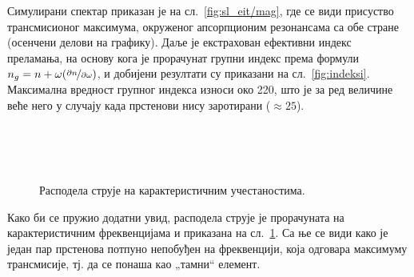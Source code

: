 \documentclass[main.tex]{subfiles}
\begin{document}
Симулирани спектар приказан је на сл.~\ref{fig:sl_eit/mag}, где се види присуство трансмисионог максимума, окруженог апсорпционим резонансама са обе стране (осенчени делови на графику). Даље је екстрахован ефективни индекс преламања, на основу кога је прорачунат групни индекс према формули $n_g = n + \omega(\nicefrac{\partial n}{\partial \omega})$, и добијени резултати су приказани на сл.~\ref{fig:indeksi}. Максимална вредност групног индекса износи око 220, што је за ред величине веће него у случају када прстенови нису заротирани ($\approx 25$).

\begin{figure}[h]
    \centering
    \\
    \\
    \\
    \caption{Расподела струје на карактеристичним учестаностима.}
    \label{fig:sl_eit/str1}
\end{figure}
Како би се пружио додатни увид, расподела струје је прорачуната на карактеристичним фреквенцијама и приказана на сл.~\ref{fig:sl_eit/str1}. Са ње се види како је један пар прстенова потпуно непобуђен на фреквенцији, која одговара максимуму трансмисије, тј. да се понаша као „тамни`` елемент.
\end{document}
